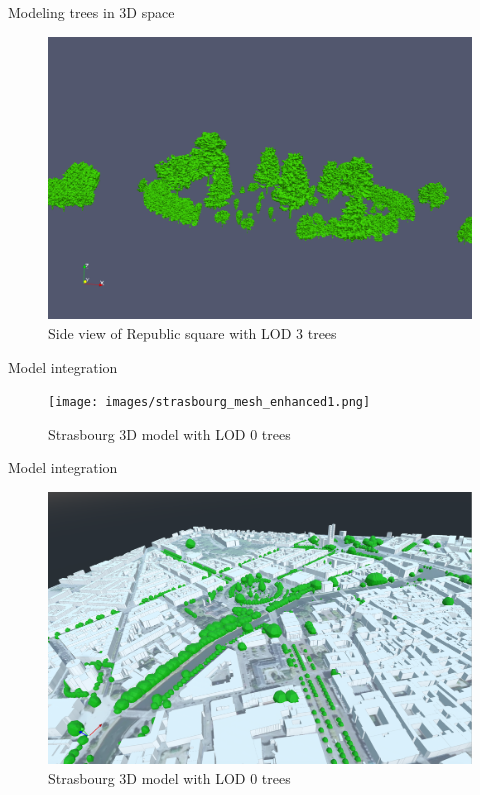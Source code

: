 \documentclass[10pt]{beamer}
\begin{document}
\begin{frame}{Modeling trees in 3D space}
  \Large
  \begin{figure}[H]
    \centering
    \includegraphics[width=1\textwidth]{images/republic_lod3_side.png}
    \caption{Side view of Republic square with LOD 3 trees}
\end{figure}
\end{frame}

\begin{frame}{Model integration}
  \Large
  \begin{figure}[H]
    \centering
    \texttt{[image: images/strasbourg\_mesh\_enhanced1.png]}
    \caption{Strasbourg 3D model with LOD 0 trees}
\end{figure}
\end{frame}

\begin{frame}{Model integration}
  \Large
  \begin{figure}[H]
    \centering
    \includegraphics[width=1\textwidth]{images/strasbourg_mesh_enhanced2.png}
    \caption{Strasbourg 3D model with LOD 0 trees}
\end{figure}
\end{frame}
\end{document}
